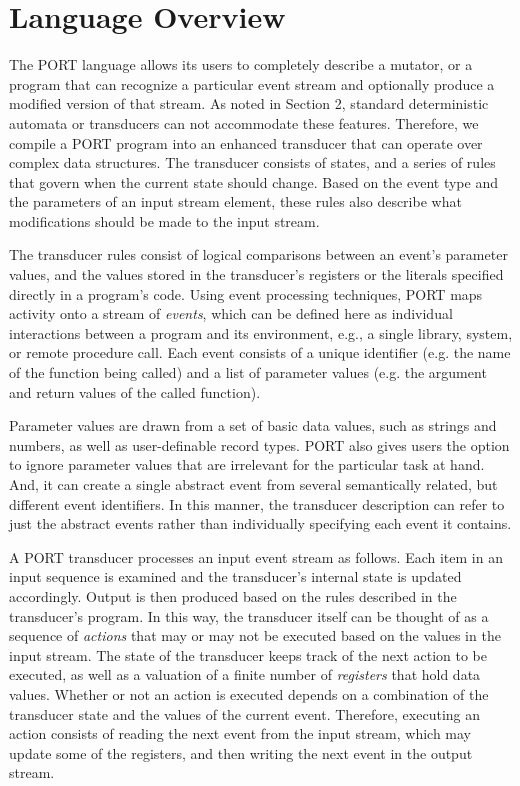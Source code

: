 \section{Language Overview}
\label{sec:Overview}

The PORT language allows its users to completely describe a mutator, or a program that can recognize a particular event stream and optionally produce a modified version of that stream.
As noted in Section 2, standard
deterministic automata or transducers can not accommodate these features.
Therefore, we compile a PORT program into
an  enhanced transducer that can operate over complex data structures.
The transducer consists of states, and
a series of rules that govern when the current state should change. Based on the event type
and the parameters of an input stream element, these rules also describe what modifications should be made to the input stream.

The transducer rules consist of logical comparisons between an event's parameter values, and the values stored in the transducer's registers or the literals specified directly in a program's code.
Using event processing techniques, PORT maps activity onto a
stream of \emph{events}, which can be defined here as individual interactions between a program and its environment, e.g.,
a single library, system, or remote procedure call.
Each event consists of a unique identifier (e.g. the name of the function being called) and a list of parameter values (e.g. the argument and return values of the called function).

Parameter values are drawn from a set of basic data values, such as strings and numbers, as well as user-definable record types. PORT also gives users the option to ignore parameter values that are irrelevant for the particular task at hand. And, it can create a single abstract event from several semantically related, but different event identifiers. In this manner, the transducer description can refer to just the abstract events rather than individually specifying each event it contains.

A PORT transducer processes an input event stream as follows.
Each item in an input
sequence is examined and the transducer's internal state is updated accordingly.
 Output is then produced based on the rules described in the transducer's program.
 In this way, 
 the transducer itself can be thought of as a sequence of \emph{actions}
 that may or may not be executed based on the values in the input stream. 
 The state of the transducer keeps track of the next action to be executed, as well as a valuation of a 
 finite number of \emph{registers} that hold data values.
 Whether or not an action is executed depends on a combination of the transducer state
 and the values of the current event.
 Therefore, executing an action consists of reading the next
event from the input stream, which may update some of the registers, and then writing the next event in the output stream.

